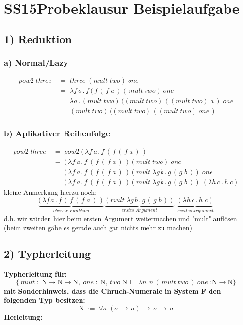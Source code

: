 \documentclass{article}
\begin{document}
	\section{SS15Probeklausur Beispielaufgabe}
	\subsection*{1) Reduktion}
	\subsubsection*{a) Normal/Lazy}
		\begin{align*}
			 pow2\;three\;	&=\;	three\;(mult\;two)\;one\\
			 				&=\;	\lambda f\,a\, .\,f\,(\,f\,(\,f\;a\,)(\,mult\;two)\;one\\
			 				&=\;	\lambda a\, .\, (mult\;two)\,((mult\;two)\,((mult\;two)\;a\,)\;one\\
			 				&=\;	(mult\;two)\,((mult\;two)\,((mult\;two)\;one\,)
		\end{align*}
	\subsubsection*{b) Aplikativer Reihenfolge}
		\begin{align*}
			pow2\;three\;	&=\;	pow2\; (\, \lambda f\,a\, .\,f\,(\,f\,(\,f\;a\,) \,)\\
							&=\;	(\, \lambda f\,a\, .\,f\,(\,f\,(\,f\;a\,) \,)(mult\;two)\;one\\
							&=\;	(\, \lambda f\,a\, .\,f\,(\,f\,(\,f\;a\,) \,)(mult\;\lambda g\,b\, .\,g\,(\,g\;b\,))\;one\\
							&=\;	(\, \lambda f\,a\, .\,f\,(\,f\,(\,f\;a\,) \,)(mult\;\lambda g\,b\, .\,g\,(\,g\;b\,))\;(\lambda h\,c\, .\,h\;c)
		\end{align*}
	kleine Anmerkung hierzu noch:
	\[
		\underbrace{(\, \lambda f\,a\, .\,f\,(\,f\,(\,f\;a\,) \,)}_{oberste\;Funktion}
		\underbrace{(mult\;\lambda g\,b\, .\,g\,(\,g\;b\,))}_{erstes\;Argument}
		\;
		\underbrace{(\lambda h\,c\, .\,h\;c)}_{zweites\;argument}
	\]
	d.h. wir w\"urden hier beim ersten Argument weitermachen und "mult" aufl\"osen
	(beim zweiten g\"abe es gerade auch gar nichts mehr zu machen)

	\subsection*{2) Typherleitung}	
		\textbf{Typherleitung f\"ur:}
		\[
			\{
			\,mult\;:\;
			\mathrm{N}\rightarrow\mathrm{N}\rightarrow\mathrm{N},\;
			one\; : \; \mathrm{N},\,two\;\mathrm{N}\,
			\vdash \; \lambda n.\,n\,(\, mult \; two\,)\;one\,:\mathrm{N}\rightarrow
			\mathrm{N}
			\}
		\]
		\textbf{mit Sonderhinweis, dass die Chruch-Numerale in System F den folgenden Typ besitzen:}
		\[
			\mathrm{N}\; := \; \forall a.(a\,\rightarrow \, a)\, \rightarrow \, a \, \rightarrow \,a		
		\]
	\textbf{Herleitung:}\\
		
\end{document}
